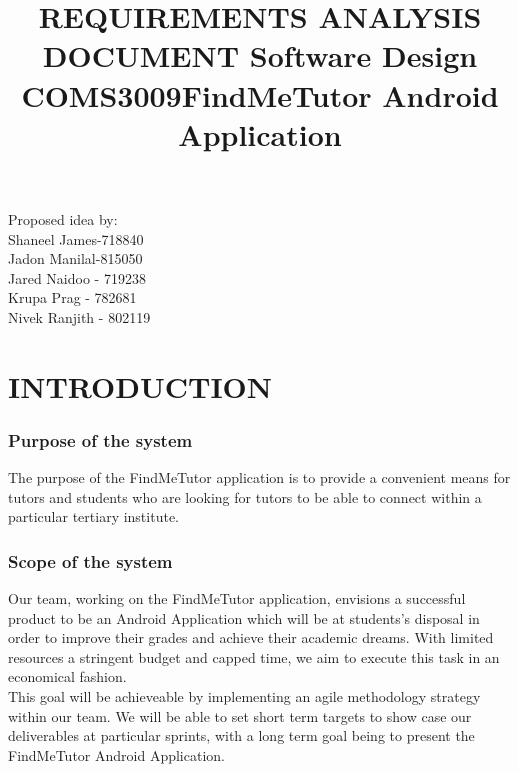 \documentclass[12pt]{article}
\begin{document}
\title{\textbf{REQUIREMENTS ANALYSIS DOCUMENT }}
\maketitle

\begin{center}
\title{\textbf{Software Design COMS3009}}
\maketitle 
\end{center}
\begin{center}
\title{\textbf{FindMeTutor Android Application}}
\maketitle 
\end{center}

\begin{center}
Proposed idea by:\\
Shaneel James-718840
\\Jadon Manilal-815050
\\Jared Naidoo - 719238
\\Krupa Prag - 782681
\\Nivek Ranjith - 802119
\end{center}

\newpage

\tableofcontents
\newpage
\section{INTRODUCTION}
\subsubsection{Purpose of the system}
\begin{flushleft}
The purpose of the FindMeTutor application is to provide a convenient means for tutors and students who are looking for tutors to be able to connect within a particular tertiary institute.
\end{flushleft}
\subsubsection{Scope of the system}
\begin{flushleft}
Our team, working on the FindMeTutor application, envisions a successful product to be an Android Application which will be at students's disposal in order to improve their grades and achieve their academic dreams. With limited resources a  stringent budget and capped time, we aim to execute this task in an economical fashion.\\
This goal will be achieveable by implementing an agile methodology strategy within our team. We will be able to set short term targets to show case our deliverables at particular sprints, with a long term goal being to present the FindMeTutor Android Application. 
\end{flushleft}
\end{document}
